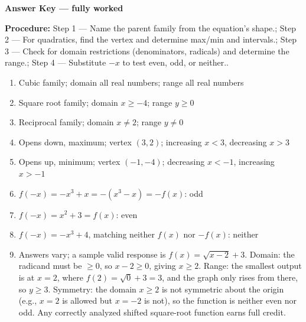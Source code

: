 \documentclass[12pt]{article}
\begin{document}
\newpage

\begin{center}{\Large \textbf{Answer Key --- fully worked}}\end{center}
\vspace{0.25cm}
\textbf{Procedure:} Step 1 --- Name the parent family from the equation's shape.; Step 2 --- For quadratics, find the vertex and determine max/min and intervals.; Step 3 --- Check for domain restrictions (denominators, radicals) and determine the range.; Step 4 --- Substitute $-x$ to test even, odd, or neither..\\[8pt]
\begin{enumerate}[label=\textbf{\arabic*.},itemsep=7pt]
  \item Cubic family; domain all real numbers; range all real numbers
  \item Square root family; domain $x\ge -4$; range $y\ge 0$
  \item Reciprocal family; domain $x\ne 2$; range $y\ne 0$
  \item Opens down, maximum; vertex $(3,2)$; increasing $x<3$, decreasing $x>3$
  \item Opens up, minimum; vertex $(-1,-4)$; decreasing $x<-1$, increasing $x>-1$
  \item $f(-x)=-x^3+x=-(x^3-x)=-f(x)$: odd
  \item $f(-x)=x^2+3=f(x)$: even
  \item $f(-x)=-x^3+4$, matching neither $f(x)$ nor $-f(x)$: neither
  \item Answers vary; a sample valid response is $f(x)=\sqrt{x-2}+3$. Domain: the radicand must be $\ge 0$, so $x-2\ge 0$, giving $x\ge 2$. Range: the smallest output is at $x=2$, where $f(2)=\sqrt{0}+3=3$, and the graph only rises from there, so $y\ge 3$. Symmetry: the domain $x\ge 2$ is not symmetric about the origin (e.g., $x=2$ is allowed but $x=-2$ is not), so the function is neither even nor odd. Any correctly analyzed shifted square-root function earns full credit.
\end{enumerate}
\end{document}
